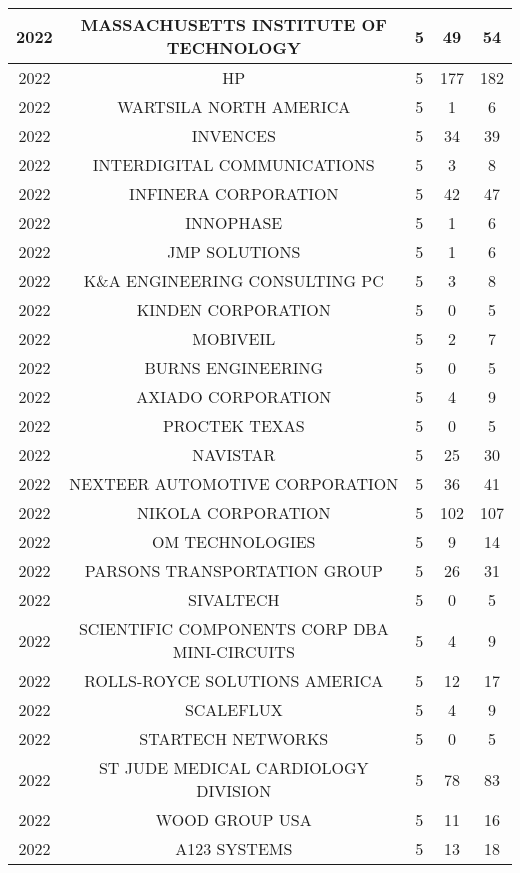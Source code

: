 \documentclass{article}%
\begin{document}
\begin{longtable}{c|c|c|c|c}
\hline%
2022&MASSACHUSETTS INSTITUTE OF TECHNOLOGY&5&49&54\\%
\hline%
2022&HP&5&177&182\\%
\hline%
2022&WARTSILA NORTH AMERICA&5&1&6\\%
\hline%
2022&INVENCES&5&34&39\\%
\hline%
2022&INTERDIGITAL COMMUNICATIONS&5&3&8\\%
\hline%
2022&INFINERA CORPORATION&5&42&47\\%
\hline%
2022&INNOPHASE&5&1&6\\%
\hline%
2022&JMP SOLUTIONS&5&1&6\\%
\hline%
2022&K\&A ENGINEERING CONSULTING PC&5&3&8\\%
\hline%
2022&KINDEN CORPORATION&5&0&5\\%
\hline%
2022&MOBIVEIL&5&2&7\\%
\hline%
2022&BURNS ENGINEERING&5&0&5\\%
\hline%
2022&AXIADO CORPORATION&5&4&9\\%
\hline%
2022&PROCTEK TEXAS&5&0&5\\%
\hline%
2022&NAVISTAR&5&25&30\\%
\hline%
2022&NEXTEER AUTOMOTIVE CORPORATION&5&36&41\\%
\hline%
2022&NIKOLA CORPORATION&5&102&107\\%
\hline%
2022&OM TECHNOLOGIES&5&9&14\\%
\hline%
2022&PARSONS TRANSPORTATION GROUP&5&26&31\\%
\hline%
2022&SIVALTECH&5&0&5\\%
\hline%
2022&SCIENTIFIC COMPONENTS CORP DBA MINI{-}CIRCUITS&5&4&9\\%
\hline%
2022&ROLLS{-}ROYCE SOLUTIONS AMERICA&5&12&17\\%
\hline%
2022&SCALEFLUX&5&4&9\\%
\hline%
2022&STARTECH NETWORKS&5&0&5\\%
\hline%
2022&ST JUDE MEDICAL CARDIOLOGY DIVISION&5&78&83\\%
\hline%
2022&WOOD GROUP USA&5&11&16\\%
\hline%
2022&A123 SYSTEMS&5&13&18\\%
\hline%
\end{longtable}

%
\end{document}
